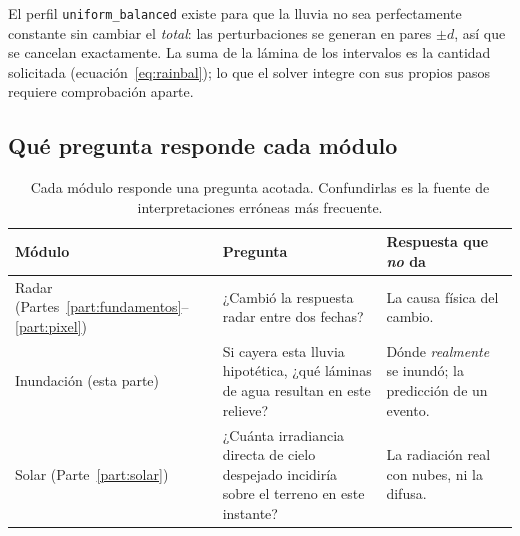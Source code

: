 \documentclass[11pt,a4paper]{article}
\begin{document}
\begin{intuicion}
El perfil \texttt{uniform\_balanced} existe para que la lluvia no sea perfectamente constante sin cambiar
el \emph{total}: las perturbaciones se generan en pares $\pm d$, así que se cancelan exactamente. La suma de
la lámina de los intervalos es la cantidad solicitada (ecuación~\eqref{eq:rainbal}); lo que el solver integre
con sus propios pasos requiere comprobación aparte.
\end{intuicion}

\subsection{Qué pregunta responde cada módulo}

\begin{table}[htbp]
\centering\small
\begin{tabularx}{\linewidth}{p{.25\linewidth}p{.28\linewidth}X}
\toprule
\textbf{Módulo} & \textbf{Pregunta} & \textbf{Respuesta que \emph{no} da}\\\midrule
Radar (Partes~\ref{part:fundamentos}--\ref{part:pixel}) & ¿Cambió la respuesta radar entre dos fechas? & La causa física del cambio.\\
Inundación (esta parte) & Si cayera esta lluvia hipotética, ¿qué láminas de agua resultan en este relieve? & Dónde \emph{realmente} se inundó; la predicción de un evento.\\
Solar (Parte~\ref{part:solar}) & ¿Cuánta irradiancia directa de cielo despejado incidiría sobre el terreno en este instante? & La radiación real con nubes, ni la difusa.\\\bottomrule
\end{tabularx}
\caption{Cada módulo responde una pregunta acotada. Confundirlas es la fuente de interpretaciones erróneas más
frecuente.}
\label{tab:modulos}
\end{table}
\end{document}
